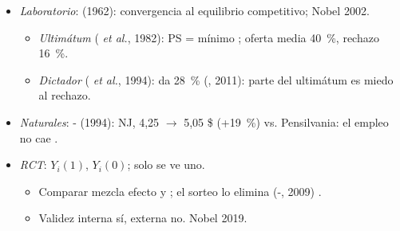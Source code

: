 \documentclass{article}
\begin{document}
\begin{columnas}
\begin{itemize}
\item \emph{Laboratorio}:  (1962): convergencia al equilibrio competitivo; Nobel 2002.
  \begin{itemize}
  \item \emph{Ultimátum} ( \emph{et al.}, 1982):  PS = mínimo ; oferta media 40~\%, rechazo 16~\%.
  \item \emph{Dictador} ( \emph{et al.}, 1994): da 28~\% (, 2011): parte del ultimátum es miedo al rechazo.
  \end{itemize}
\item \emph{Naturales}: - (1994): NJ, 4,25 $\to$ 5,05 \$ (+19~\%) vs. Pensilvania: el empleo no cae .
\item \emph{RCT}: $Y_i(1)$, $Y_i(0)$; solo se ve uno.
  \begin{itemize}
  \item Comparar mezcla efecto y ; el sorteo lo elimina (-, 2009) .
  \item Validez interna sí, externa no. Nobel 2019.
  \end{itemize}
\end{itemize}


\end{columnas}
\end{document}
